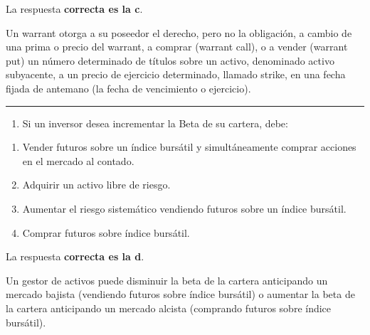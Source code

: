 \documentclass[
  letterpaper,
  DIV=11,
  numbers=noendperiod]{scrreprt}
\providecommand{\tightlist}{%
  \setlength{\itemsep}{0pt}\setlength{\parskip}{0pt}}\usepackage{longtable,booktabs,array}
\begin{document}
\begin{tcolorbox}[enhanced jigsaw, left=2mm, opacityback=0, colback=white, breakable, arc=.35mm, bottomrule=.15mm, rightrule=.15mm, toprule=.15mm, leftrule=.75mm, colframe=quarto-callout-tip-color-frame]
\begin{minipage}[t]{5.5mm}
\textcolor{quarto-callout-tip-color}{\faLightbulb}
\end{minipage}%
\begin{minipage}[t]{\textwidth - 5.5mm}

La respuesta \textbf{correcta es la c}.

Un warrant otorga a su poseedor el derecho, pero no la obligación, a
cambio de una prima o precio del warrant, a comprar (warrant call), o a
vender (warrant put) un número determinado de títulos sobre un activo,
denominado activo subyacente, a un precio de ejercicio determinado,
llamado strike, en una fecha fijada de antemano (la fecha de vencimiento
o ejercicio).

\end{minipage}%
\end{tcolorbox}

\begin{center}\rule{0.5\linewidth}{0.5pt}\end{center}

\begin{enumerate}
\def\labelenumi{\arabic{enumi}.}
\setcounter{enumi}{33}
\tightlist
\item
  Si un inversor desea incrementar la Beta de su cartera, debe:
\end{enumerate}

\begin{enumerate}
\def\labelenumi{\alph{enumi})}
\item
  Vender futuros sobre un índice bursátil y simultáneamente comprar
  acciones en el mercado al contado.
\item
  Adquirir un activo libre de riesgo.
\item
  Aumentar el riesgo sistemático vendiendo futuros sobre un índice
  bursátil.
\item
  Comprar futuros sobre índice bursátil.
\end{enumerate}

\begin{tcolorbox}[enhanced jigsaw, left=2mm, opacityback=0, colback=white, breakable, arc=.35mm, bottomrule=.15mm, rightrule=.15mm, toprule=.15mm, leftrule=.75mm, colframe=quarto-callout-tip-color-frame]
\begin{minipage}[t]{5.5mm}
\textcolor{quarto-callout-tip-color}{\faLightbulb}
\end{minipage}%
\begin{minipage}[t]{\textwidth - 5.5mm}

La respuesta \textbf{correcta es la d}.

Un gestor de activos puede disminuir la beta de la cartera anticipando
un mercado bajista (vendiendo futuros sobre índice bursátil) o aumentar
la beta de la cartera anticipando un mercado alcista (comprando futuros
sobre índice bursátil).

\end{minipage}%
\end{tcolorbox}
\end{document}
